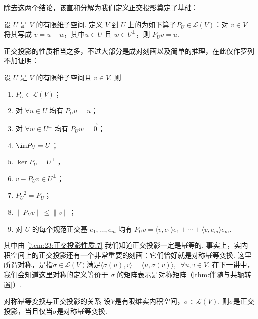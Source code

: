 除去这两个结论，该直和分解为我们定义正交投影奠定了基础：
\begin{definition}{}{}
    设 $ U $ 是 $ V $ 的有限维子空间. 定义 $ V $ 到 $ U $ 上的为如下算子$ P_U \in \mathcal{L} (V)$：对 $ v \in V $ 将其写成 $ v = u + w $，其中$ u \in U $ 且 $ w \in U^{\perp }$，则 $ P_U v = u $.
\end{definition}

正交投影的性质相当之多，不过大部分是成对刻画以及简单的推理，在此仅作罗列不加证明：

设 $ U $ 是 $ V $ 的有限维子空间且 $ v \in V$. 则
\begin{enumerate}
    \item $ P_U \in \mathcal{L} (V) $；

    \item 对 $ \forall u \in U$ 均有 $ P_U u = u $；

    \item 对 $ \forall w \in U^{\perp}$ 均有 $ P_U w = \vec{0} $；

    \item $ \im P_U = U$；

    \item $ \ker P_U = U^{\perp}$；

    \item $ v - P_U v \in U^{\perp}$；

    \item \label{item:23:正交投影性质:7}
          $ {P_U}^{2} = P_U$；

    \item $ \lVert P_U v\rVert \leqslant \lVert v \rVert $；

    \item 对 $ U $ 的每个规范正交基 $e_1, \ldots , e_m$ 均有 $ P_U v = \langle v, e_1 \rangle e_1 + \cdots + \langle v, e_m \rangle e_m$.
\end{enumerate}
其中由 \ref*{item:23:正交投影性质:7} 我们知道正交投影一定是幂等的. 事实上，实内积空间上的正交投影还有一个非常重要的刻画：它们恰好就是对称幂等变换. 这里所谓对称，是指$\sigma\in \mathcal{L}(V)$满足$\langle \sigma(u),v\rangle = \langle u,\sigma(v)\rangle,\enspace \forall u,v\in V$. 在下一讲中，我们会知道这里对称的定义等价于 $\sigma$ 的矩阵表示是对称矩阵（\autoref{thm:伴随与共轭转置}）.

\begin{theorem}{}{对称幂等变换与正交投影的关系}
    设$V$是有限维实内积空间，$\sigma\in \mathcal{L}(V)$. 则$\sigma$是正交投影，当且仅当$\sigma$是对称幂等变换.
\end{theorem}

